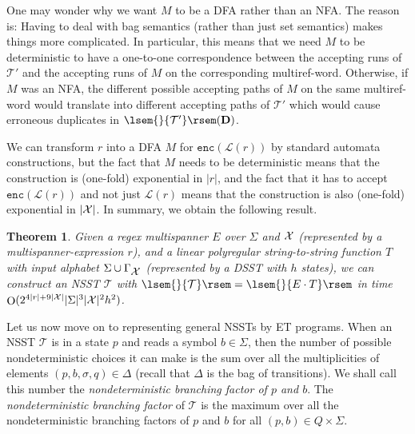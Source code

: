 \documentclass[
a4paper
]{article}
\theoremstyle{plain}
\newtheorem{theorem}{Theorem}[section]
\theoremstyle{definition}
\theoremstyle{remark}
\newcommand{\varset}{\mbox{\ensuremath{\mathcal{X}}}}
\newcommand{\varsetSmallFont}{\ensuremath{\mathcal{X}}}
\newcommand{\doc}{\ensuremath{\mathbf{D}}}
\newcommand{\lang}[1]{\ensuremath{\mathcal{L}(#1)}}
\newcommand{\nrefw}[1]{\ensuremath{\mathtt{enc}(#1)}}
\newcommand{\nsst}{\mathcal{T}}
\newcommand{\sst}{\mathcal{T}}
\newcommand{\sem}[1]{{\lsem{}{#1}\rsem}}
\DeclareMathOperator{\bigo}{O}
\begin{document}
One may wonder why we want $M$ to be a DFA rather than an NFA. The reason is:
Having to deal with bag semantics (rather than just set semantics) makes things more complicated.
In particular, this means that we need $M$ to be deterministic to have a one-to-one correspondence between the accepting runs of $\sst'$ and the accepting runs of $M$ on the corresponding multiref-word.
Otherwise,
if $M$ was an NFA,
the different possible accepting paths of $M$ on the same multiref-word would translate into different accepting paths of $\sst'$ which would cause erroneous duplicates in $\sem{\sst'}(\doc)$.

We can transform $r$ into a DFA $M$ for $\nrefw{\lang{r}}$ by standard automata constructions, but the fact that $M$ needs to be deterministic means that the construction is
(one-fold)
exponential in $|r|$, and the fact that it has to accept $\nrefw{\lang{r}}$ and not just $\lang{r}$ means that the construction is also
(one-fold)
exponential in $|\varset|$.
In summary, we obtain the following result.

\begin{theorem}\label{ETtoNSST}
  Given a regex multispanner $E$ over $\Sigma$ and $\varset$ (represented by a multispanner-expression $r$), and a linear polyregular string-to-string function $T$ with input alphabet $\Sigma \cup \Gamma_{\varset}$ (represented by a DSST with $h$ states),
we can construct an NSST $\sst$ with $\sem{\sst} = \sem{E \cdot T}$ in time $\bigo(2^{4|r|+9|\varsetSmallFont|} |\Sigma|^3 |\varset|^2 h^2)$.
\end{theorem}


Let us now move on to representing general NSSTs by ET programs. When an NSST $\nsst$ is in a state $p$ and reads a symbol $b \in \Sigma$, then the number of possible nondeterministic choices it can make is the sum over all the multiplicities of elements $(p, b, \sigma, q) \in \Delta$ (recall that $\Delta$ is the bag of transitions). We shall call this number the \emph{nondeterministic branching factor of $p$ and $b$}.
The
\emph{nondeterministic branching factor} of $\nsst$ is the maximum over all the nondeterministic branching factors of $p$ and $b$ for all $(p,b) \in Q\times \Sigma$.
\end{document}
